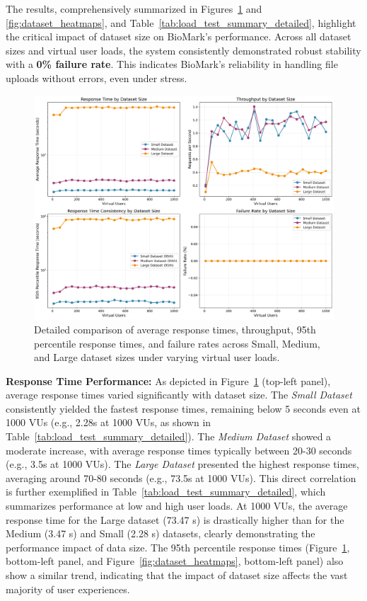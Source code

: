 \documentclass[journal]{IEEEtran}
\begin{document}
The results, comprehensively summarized in Figures~\ref{fig:dataset_analysis} and \ref{fig:dataset_heatmaps}, and Table~\ref{tab:load_test_summary_detailed}, highlight the critical impact of dataset size on BioMark's performance. Across all dataset sizes and virtual user loads, the system consistently demonstrated robust stability with a \textbf{0\% failure rate}. This indicates BioMark's reliability in handling file uploads without errors, even under stress.

\begin{figure}[htbp]
\centering
\includegraphics[width=\columnwidth]{loadtest_results/dataset_size_analysis.png}
\caption{Detailed comparison of average response times, throughput, 95th percentile response times, and failure rates across Small, Medium, and Large dataset sizes under varying virtual user loads.}
\label{fig:dataset_analysis}
\end{figure}

\textbf{Response Time Performance:} As depicted in Figure~\ref{fig:dataset_analysis} (top-left panel), average response times varied significantly with dataset size. The \textit{Small Dataset} consistently yielded the fastest response times, remaining below 5 seconds even at 1000 VUs (e.g., 2.28s at 1000 VUs, as shown in Table~\ref{tab:load_test_summary_detailed}). The \textit{Medium Dataset} showed a moderate increase, with average response times typically between 20-30 seconds (e.g., 3.5s at 1000 VUs). The \textit{Large Dataset} presented the highest response times, averaging around 70-80 seconds (e.g., 73.5s at 1000 VUs). This direct correlation is further exemplified in Table~\ref{tab:load_test_summary_detailed}, which summarizes performance at low and high user loads. At 1000 VUs, the average response time for the Large dataset (73.47 s) is drastically higher than for the Medium (3.47 s) and Small (2.28 s) datasets, clearly demonstrating the performance impact of data size. The 95th percentile response times (Figure~\ref{fig:dataset_analysis}, bottom-left panel, and Figure~\ref{fig:dataset_heatmaps}, bottom-left panel) also show a similar trend, indicating that the impact of dataset size affects the vast majority of user experiences.
\end{document}
